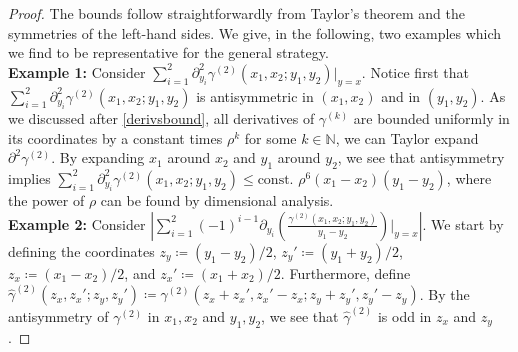 \documentclass[a4paper,11pt]{article}
\newcommand{\abs}[1]{\left\lvert #1 \right\rvert}
\numberwithin{equation}{section}
\begin{document}
	\begin{proof}
		The bounds follow straightforwardly from Taylor's theorem and the symmetries of the left-hand sides.
		We give, in the following, two examples which we find to be representative for the general strategy.\\
		\textbf{Example 1:} Consider $ \sum_{i=1}^{2}\partial_{y_i}^2\gamma^{(2)}(x_1,x_2;y_1,y_2)\rvert_{y=x} $. Notice first that $ \sum_{i=1}^{2}\partial_{y_i}^2\gamma^{(2)}(x_1,x_2;y_1,y_2) $ is antisymmetric in $ (x_1,x_2) $ and in $ (y_1,y_2) $. As we discussed after \eqref{derivsbound}, all derivatives of $ \gamma^{(k)} $ are bounded uniformly in its coordinates by a constant times $ \rho^k $ for some $ k\in\mathbb{N} $, we can Taylor expand $ \partial^2\gamma^{(2)} $. By expanding $ x_1 $ around $ x_2 $ and $ y_1 $ around $ y_2 $, we see that antisymmetry implies $ \sum_{i=1}^{2}\partial_{y_i}^2\gamma^{(2)}(x_1,x_2;y_1,y_2)\leq \text{const. }\rho^6(x_1-x_2)(y_1-y_2) $, where the power of $ \rho $ can be found by dimensional analysis.\\
		\textbf{Example 2:} Consider $\abs{\sum_{i=1}^{2}(-1)^{i-1}\partial_{y_i}\left(\frac{\gamma^{(2)}(x_1,x_2;y_1,y_2)}{y_1-y_2}\right)\Bigg\rvert_{y=x}}$. We start by defining the coordinates $z_y\coloneqq (y_1-y_2)/2$, $z_y'\coloneqq (y_1+y_2)/2$, $z_x\coloneqq (x_1-x_2)/2$, and $z_x'\coloneqq (x_1+x_2)/2$. Furthermore, define $\hat{\gamma}^{(2)}(z_x,z_x';z_y,z_y')\coloneqq\gamma^{(2)}(z_x+z_x',z_x'-z_x;z_y+z_y',z_y'-z_y)$. By the antisymmetry of $\gamma^{(2)}$ in $x_1,x_2$ and $y_1,y_2$, we see that $\hat{\gamma}^{(2)}$ is odd in $z_x$ and $z_y$.
		

\end{proof}
\end{document}
